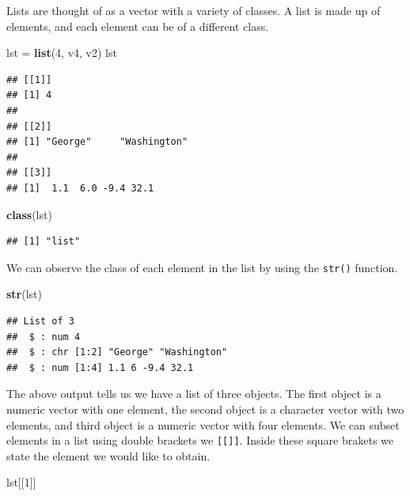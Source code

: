 \documentclass[
]{book}
\newenvironment{Shaded}{\begin{snugshade}}{\end{snugshade}}
\newcommand{\DecValTok}[1]{\textcolor[rgb]{0.00,0.00,0.81}{#1}}
\newcommand{\KeywordTok}[1]{\textcolor[rgb]{0.13,0.29,0.53}{\textbf{#1}}}
\newcommand{\NormalTok}[1]{#1}
\newcommand{\StringTok}[1]{\textcolor[rgb]{0.31,0.60,0.02}{#1}}
\begin{document}
Lists are thought of as a vector with a variety of classes. A list is made up of elements, and each element can be of a different class.

\begin{Shaded}
\begin{Highlighting}[]
\NormalTok{lst =}\StringTok{ }\KeywordTok{list}\NormalTok{(}\DecValTok{4}\NormalTok{, v4, v2)}
\NormalTok{lst}
\end{Highlighting}
\end{Shaded}

\begin{verbatim}
## [[1]]
## [1] 4
## 
## [[2]]
## [1] "George"     "Washington"
## 
## [[3]]
## [1]  1.1  6.0 -9.4 32.1
\end{verbatim}

\begin{Shaded}
\begin{Highlighting}[]
\KeywordTok{class}\NormalTok{(lst)}
\end{Highlighting}
\end{Shaded}

\begin{verbatim}
## [1] "list"
\end{verbatim}

We can observe the class of each element in the list by using the \texttt{str()} function.

\begin{Shaded}
\begin{Highlighting}[]
\KeywordTok{str}\NormalTok{(lst)}
\end{Highlighting}
\end{Shaded}

\begin{verbatim}
## List of 3
##  $ : num 4
##  $ : chr [1:2] "George" "Washington"
##  $ : num [1:4] 1.1 6 -9.4 32.1
\end{verbatim}

The above output tells us we have a list of three objects. The first object is a numeric vector with one element, the second object is a character vector with two elements, and third object is a numeric vector with four elements. We can subset elements in a list using double brackets we \texttt{{[}{[}{]}{]}}. Inside these square brakets we state the element we would like to obtain.

\begin{Shaded}
\begin{Highlighting}[]
\NormalTok{lst[[}\DecValTok{1}\NormalTok{]]}
\end{Highlighting}
\end{Shaded}
\end{document}
